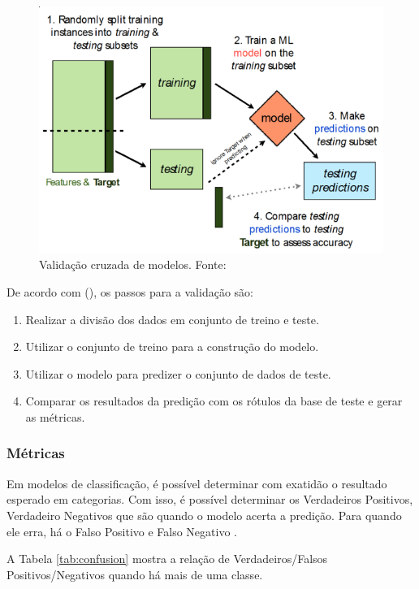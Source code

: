 \begin{figure}[h]
	\centering
    \includegraphics[keepaspectratio=true,scale=0.7]{figuras/crossValidation}
	\caption[Validação cruzada de modelos]{Validação cruzada de modelos. Fonte: \cite[Página 82]{BRINK2015}}
	\label{fig:crossValidation}
\end{figure}

De acordo com \citeauthor{BRINK2015} (\citeyear{BRINK2015}), os passos para a validação são: 
\begin{enumerate}
	\item Realizar a divisão dos dados em conjunto de treino e teste.
	\item Utilizar o conjunto de treino para a construção do modelo.
    \item Utilizar o modelo para predizer o conjunto de dados de teste.
    \item Comparar os resultados da predição com os rótulos da base de teste e gerar as métricas.
\end{enumerate}

\subsubsection{Métricas}

Em modelos de classificação, é possível determinar com exatidão o resultado esperado em categorias. Com isso, é possível determinar os Verdadeiros Positivos, Verdadeiro Negativos que são quando o modelo acerta a predição. Para quando ele erra, há o Falso Positivo e Falso Negativo \cite{BRINK2015}.

A Tabela \ref{tab:confusion} mostra a relação de Verdadeiros/Falsos Positivos/Negativos quando há mais de uma classe.

